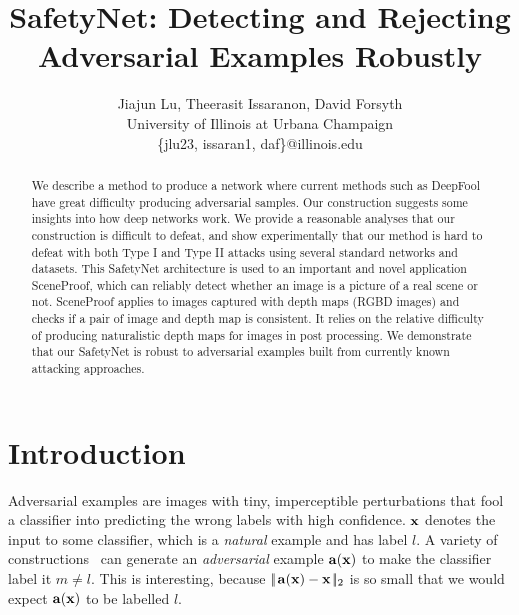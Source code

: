 \documentclass[10pt,twocolumn,letterpaper]{article}
\newcommand{\ltwonorm}[1]{{\mid\!\mid\!{#1}\!\mid\!\mid_2}}
\newcommand{\vect}[1]{{\bf {#1}}}
\begin{document}
\title{SafetyNet: Detecting and Rejecting Adversarial Examples Robustly}

\author{Jiajun Lu, Theerasit Issaranon, David Forsyth\\
University of Illinois at Urbana Champaign\\
\{jlu23, issaran1, daf\}@illinois.edu
}

\maketitle


\begin{abstract}
We describe a method to produce a network where current methods such as DeepFool have great difficulty producing adversarial samples.
Our construction suggests some insights into how deep networks work.
We provide a reasonable analyses that our construction is difficult to defeat, and 
show experimentally that our method is hard to defeat with both Type I and Type II attacks using several standard networks and datasets.  
This SafetyNet architecture is used to an important and novel application SceneProof, which can reliably detect whether an image is a picture of a real scene or not.  
SceneProof applies to images captured with depth maps (RGBD images) and checks if a pair of image and depth map
is consistent.  It relies on the relative difficulty of producing naturalistic depth maps for images in post processing.
We demonstrate that our SafetyNet is robust to adversarial examples built from currently known attacking approaches.
\end{abstract}

\section{Introduction}

Adversarial examples are images with tiny, imperceptible perturbations that fool a classifier into predicting the wrong labels with high confidence. 
$\vect{x}$ denotes the input to some classifier, which is a {\em natural} example and has label $l$.
A variety of constructions~\cite{goodfellow2014explaining,kurakin2016adversarial,moosavi2016deepfool,papernot2016practical} can generate 
an {\em adversarial} example $\vect{a}(\vect{x})$ to make the classifier label it 
$m \neq l$.  This is interesting, because $\ltwonorm{\vect{a}(\vect{x})-\vect{x}}$ is so small that we 
would expect $\vect{a}(\vect{x})$ to be labelled $l$. 
\end{document}
